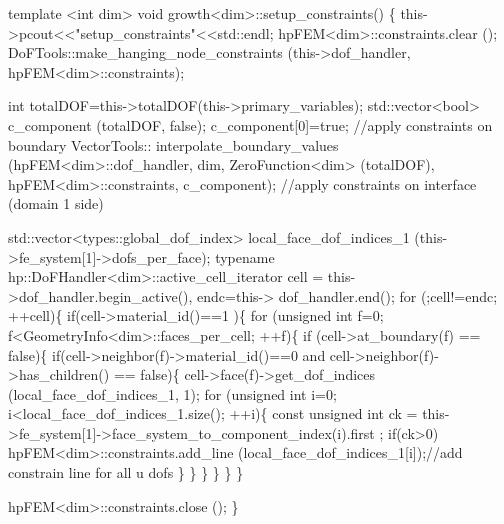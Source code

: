 \begin{DoxyCode}
\textcolor{keyword}{template} <\textcolor{keywordtype}{int} dim>
\textcolor{keywordtype}{void} growth<dim>::setup\_constraints()
\{
    this->pcout<<\textcolor{stringliteral}{"setup\_constraints"}<<std::endl;
    hpFEM<dim>::constraints.clear ();
    DoFTools::make\_hanging\_node\_constraints (this->dof\_handler, 
      hpFEM<dim>::constraints);
    
    \textcolor{keywordtype}{int} totalDOF=this->totalDOF(this->primary\_variables);
  std::vector<bool> c\_component (totalDOF, \textcolor{keyword}{false}); c\_component[0]=\textcolor{keyword}{true}; 
    \textcolor{comment}{//apply constraints on boundary}
    VectorTools:: interpolate\_boundary\_values (hpFEM<dim>::dof_handler, dim, ZeroFunction<dim> (totalDOF),
      hpFEM<dim>::constraints, c\_component);
    \textcolor{comment}{//apply constraints on interface (domain 1 side)}
    
    std::vector<types::global\_dof\_index> local\_face\_dof\_indices\_1 (this->fe\_system[1]->dofs\_per\_face);
  \textcolor{keyword}{typename} hp::DoFHandler<dim>::active\_cell\_iterator cell = this->dof\_handler.begin\_active(), endc=this->
      dof\_handler.end();
  \textcolor{keywordflow}{for} (;cell!=endc; ++cell)\{
        \textcolor{keywordflow}{if}(cell->material\_id()==1 )\{
        \textcolor{keywordflow}{for} (\textcolor{keywordtype}{unsigned} \textcolor{keywordtype}{int} f=0; f<GeometryInfo<dim>::faces\_per\_cell; ++f)\{
                \textcolor{keywordflow}{if} (cell->at\_boundary(f) == \textcolor{keyword}{false})\{
                    \textcolor{keywordflow}{if}(cell->neighbor(f)->material\_id()==0 and cell->neighbor(f)->has\_children() == \textcolor{keyword}{false})\{
                    cell->face(f)->get\_dof\_indices (local\_face\_dof\_indices\_1, 1);
                    \textcolor{keywordflow}{for} (\textcolor{keywordtype}{unsigned} \textcolor{keywordtype}{int} i=0; i<local\_face\_dof\_indices\_1.size(); ++i)\{
                        \textcolor{keyword}{const} \textcolor{keywordtype}{unsigned} \textcolor{keywordtype}{int} ck = this->fe\_system[1]->face\_system\_to\_component\_index(i).first
      ;
                        \textcolor{keywordflow}{if}(ck>0) hpFEM<dim>::constraints.add\_line (local\_face\_dof\_indices\_1[i]);\textcolor{comment}{//add
       constrain line for all u dofs}
                    \}
                    \}
                \}
            \}
        \}
    \}
    
    hpFEM<dim>::constraints.close ();
\}
\end{DoxyCode}


